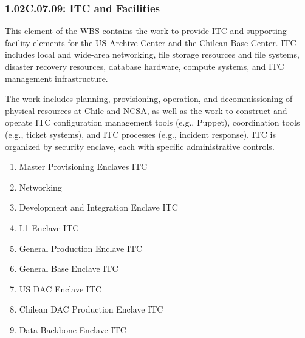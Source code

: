 \subsubsection*{1.02C.07.09: ITC and Facilities}

This element of the WBS contains the work to provide ITC and supporting facility elements for the US Archive Center and the Chilean Base Center.
ITC includes local and wide-area networking, file storage resources and file systems, disaster recovery resources, database hardware, compute systems, and ITC management infrastructure.

The work includes planning, provisioning, operation, and decommissioning of physical resources at Chile and NCSA, as well as the work to construct and operate ITC configuration management tools (e.g., Puppet), coordination tools (e.g., ticket systems), and ITC processes (e.g., incident response).
ITC is organized by security enclave, each with specific administrative controls.

\begin{enumerate}

  \item{Master Provisioning Enclaves ITC}
  \item{Networking}
  \item{Development and Integration Enclave ITC}
  \item{L1 Enclave ITC}
  \item{General Production Enclave ITC}
  \item{General Base Enclave ITC}
  \item{US DAC Enclave ITC}
  \item{Chilean DAC Production Enclave ITC}
  \item{Data Backbone Enclave ITC}

\end{enumerate}

